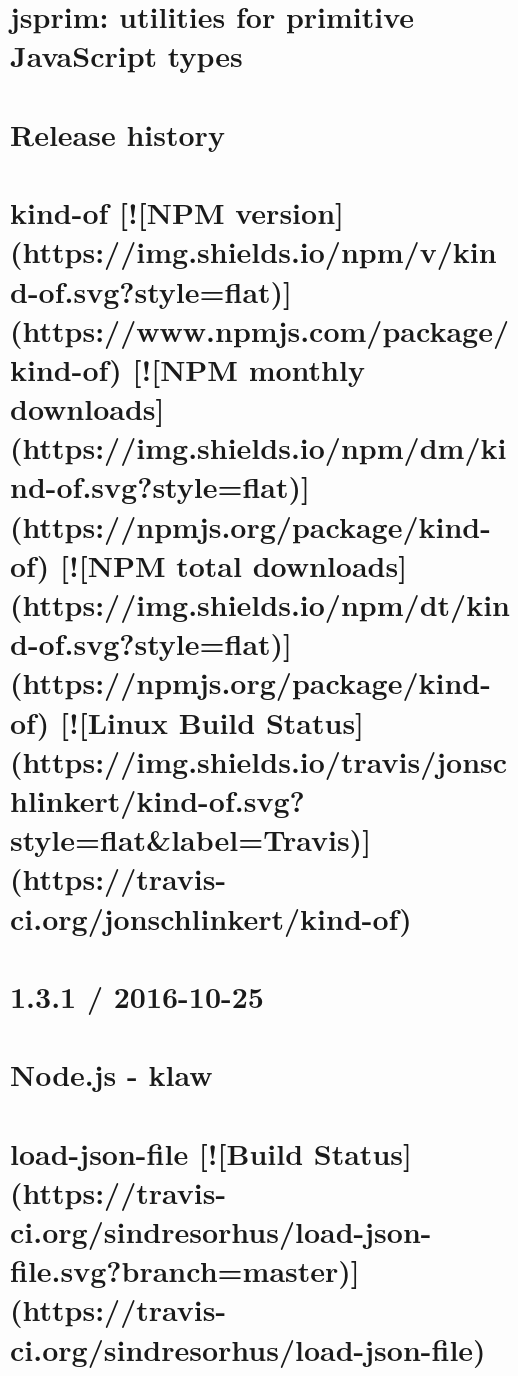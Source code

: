 \documentclass[twoside]{book}
\newcommand{\+}{\discretionary{\mbox{\scriptsize$\hookleftarrow$}}{}{}}
\begin{document}
\chapter{jsprim\+: utilities for primitive Java\+Script types}
\label{md_dsmacc_vis_degree_node_modules_jsprim_README}

\chapter{Release history}
\label{md_dsmacc_vis_degree_node_modules_kind-of_CHANGELOG}

\chapter{kind-\/of \mbox{[}!\mbox{[}N\+PM version\mbox{]}(https\+://img.shields.\+io/npm/v/kind-\/of.svg?style=flat)\mbox{]}(https\+://www.npmjs.\+com/package/kind-\/of) \mbox{[}!\mbox{[}N\+PM monthly downloads\mbox{]}(https\+://img.shields.\+io/npm/dm/kind-\/of.svg?style=flat)\mbox{]}(https\+://npmjs.org/package/kind-\/of) \mbox{[}!\mbox{[}N\+PM total downloads\mbox{]}(https\+://img.shields.\+io/npm/dt/kind-\/of.svg?style=flat)\mbox{]}(https\+://npmjs.org/package/kind-\/of) \mbox{[}!\mbox{[}Linux Build Status\mbox{]}(https\+://img.shields.\+io/travis/jonschlinkert/kind-\/of.svg?style=flat\&label=Travis)\mbox{]}(https\+://travis-\/ci.org/jonschlinkert/kind-\/of)}
\label{md_dsmacc_vis_degree_node_modules_kind-of_README}

\chapter{1.3.1 / 2016-\/10-\/25}
\label{md_dsmacc_vis_degree_node_modules_klaw_CHANGELOG}

\chapter{Node.\+js -\/ klaw}
\label{md_dsmacc_vis_degree_node_modules_klaw_README}

\chapter{load-\/json-\/file \mbox{[}!\mbox{[}Build Status\mbox{]}(https\+://travis-\/ci.org/sindresorhus/load-\/json-\/file.svg?branch=master)\mbox{]}(https\+://travis-\/ci.org/sindresorhus/load-\/json-\/file)}
\label{md_dsmacc_vis_degree_node_modules_load-json-file_readme}

\end{document}
